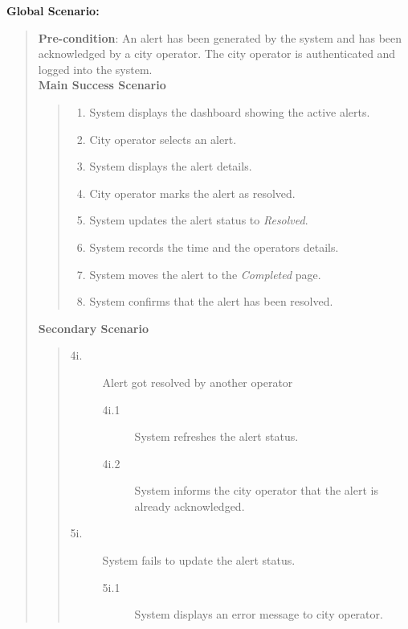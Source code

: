 \documentclass[]{article}
\begin{document}
\begin{enumerate}[{\bf BE6.}]
        {\bf Global Scenario:}
        	\begin{quote}
        	    \textbf{Pre-condition}: An alert has been generated by the system and has been acknowledged by a city operator. The city operator is authenticated and logged into the system. \\
                \textbf{Main Success Scenario} 
                    \begin{quote}
                    \begin{enumerate}[1.]
                        \item System displays the dashboard showing the active alerts.
                        \item City operator selects an alert.
                        \item System displays the alert details.
                        \item City operator marks the alert as resolved.
                        \item System updates the alert status to \textit{Resolved}.
                        \item System records the time and the operators details.
                        \item System moves the alert to the \textit{Completed} page.
                        \item System confirms that the alert has been resolved.
                    \end{enumerate}
                    \end{quote}
                \textbf{Secondary Scenario} 
                \begin{quote}
                    \begin{description}
                        \item[\textmd{4i.}] Alert got resolved by another operator
                        \begin{description}
                            \item[\textmd{4i.1}] System refreshes the alert status.
                            \item[\textmd{4i.2}] System informs the city operator that the alert is already acknowledged.
                        \end{description}
                        \item[\textmd{5i.}] System fails to update the alert status.
                        \begin{description}
                            \item[\textmd{5i.1}] System displays an error message to city operator.

\end{description}
\end{description}
\end{quote}
\end{quote}
\end{enumerate}
\end{document}
